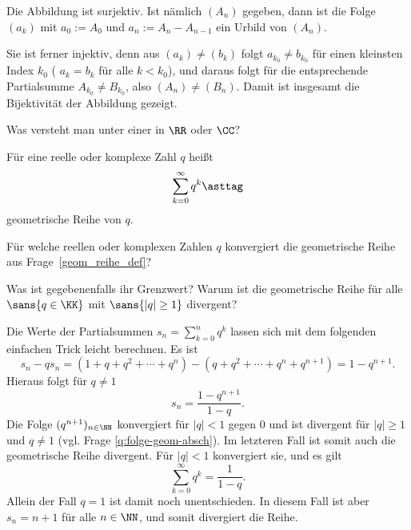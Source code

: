 \begin{antwort}
  Die Abbildung ist surjektiv. Ist nämlich $(A_n)$ 
  gegeben, dann ist die Folge $(a_k)$ mit $a_0 := A_0$ und 
  $a_n:=A_n-A_{n-1}$ ein Urbild von $(A_n)$.  

  Sie ist ferner injektiv, denn aus 
  $(a_k)\not= (b_k)$ folgt $a_{k_0} \not= b_{k_0}$ 
  für einen kleinsten Index $k_0$ ({\dasheisst} $a_k = b_k$ für alle $k<k_0$), 
  und daraus 
  folgt für die entsprechende Partialsumme 
  $A_{k_0} \not= B_{k_0}$, also $(A_n) \not= (B_n)$. 
  Damit ist insgesamt die Bijektivität der Abbildung gezeigt.
  \AntEnd
\end{antwort}

\begin{frage}
  Was versteht man unter einer 
   in $\RR$ oder $\CC$? 
\end{frage}

\begin{antwort}
  \label{geom_reihe_def}
  Für eine reelle oder komplexe Zahl $q$ heißt 
  \[ 
  \sum_{k=0}^\infty q^k \asttag
  \]
  geometrische Reihe von $q$.
  \AntEnd
\end{antwort}

\begin{frage}
  \label{02_rgeom}
  Für welche reellen oder komplexen Zahlen $q$ konvergiert die 
  geometrische Reihe~{\astref} aus Frage~\ref{geom_reihe_def}? 
  
  Was ist gegebenenfalls ihr Grenzwert?
  Warum ist die geometrische Reihe für alle $\sans{q\in\KK}$ 
  mit $\sans{|q|\ge 1}$ divergent? 
\end{frage}

\begin{antwort}
  Die Werte der Partialsummen $s_n = \sum_{k=0}^n q^k$ lassen sich mit dem 
  folgenden einfachen Trick leicht berechnen. Es ist 
  \[
  s_n - qs_n  = 
  (1+q+q^2+\cdots+q^n)-(q+q^2+\cdots + q^n + q^{n+1}) = 1-q^{n+1}.
  \] 
  Hieraus folgt für $q\not=1$
  \[
  s_n=\frac{ 1-q^{n+1} }{ 1-q }.
  \]
  Die Folge $(q^{n+1})_{n\in\NN}$ konvergiert 
  für $|q| < 1$ gegen $0$ und ist divergent für $|q|\ge 1$ und $q\not=1$ 
  (vgl. Frage \ref{q:folge-geom-absch}). 
  Im letzteren Fall ist somit auch die geometrische Reihe divergent.  
  Für $|q| < 1$ konvergiert sie, und es gilt
  \[
  \boxed{\sum_{k=0}^\infty q^k = \frac{1}{1-q}.}
  \]
  Allein der Fall $q=1$ ist damit noch unentschieden. In diesem Fall ist aber 
  $s_n =n+1$ für alle $n\in\NN$, und somit divergiert die Reihe. \AntEnd
\end{antwort}

